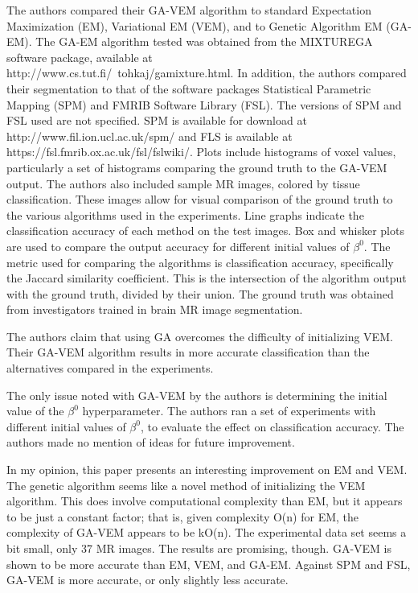 \documentclass[11pt]{article}
\begin{document}
The authors compared their GA-VEM algorithm to standard Expectation Maximization
(EM), Variational EM (VEM), and to Genetic Algorithm EM (GA-EM). The GA-EM
algorithm tested was obtained from the MIXTUREGA software package, available at
\\ http://www.cs.tut.fi/~tohkaj/gamixture.html. In addition, the authors
compared their segmentation to that of the software packages Statistical
Parametric Mapping (SPM) and FMRIB Software Library (FSL). The versions of SPM
and FSL used are not specified. SPM is available for download at
http://www.fil.ion.ucl.ac.uk/spm/ and FLS is available at
https://fsl.fmrib.ox.ac.uk/fsl/fslwiki/. Plots include histograms of voxel
values, particularly a set of histograms comparing the ground truth to the
GA-VEM output. The authors also included sample MR images, colored by tissue
classification. These images allow for visual comparison of the ground truth to
the various algorithms used in the experiments. Line graphs indicate the
classification accuracy of each method on the test images. Box and whisker plots
are used to compare the output accuracy for different initial values of
\(\beta^0\). The metric used for comparing the algorithms is classification
accuracy, specifically the Jaccard similarity coefficient. This is the
intersection of the algorithm output with the ground truth, divided by their
union. The ground truth was obtained from investigators trained in brain MR
image segmentation.

The authors claim that using GA overcomes the difficulty of initializing VEM.
Their GA-VEM algorithm results in more accurate classification than the
alternatives compared in the experiments.

The only issue noted with GA-VEM by the authors is determining the initial value
of the \(\beta^0\) hyperparameter. The authors ran a set of experiments with
different initial values of \(\beta^0\), to evaluate the effect on
classification accuracy. The authors made no mention of ideas for future
improvement.

In my opinion, this paper presents an interesting improvement on EM and VEM. The
genetic algorithm seems like a novel method of initializing the VEM algorithm.
This does involve computational complexity than EM, but it appears to be just a
constant factor; that is, given complexity O(n) for EM, the complexity of GA-VEM
appears to be kO(n). The experimental data set seems a bit small, only 37 MR
images. The results are promising, though. GA-VEM is shown to be more accurate
than EM, VEM, and GA-EM. Against SPM and FSL, GA-VEM is more accurate, or only
slightly less accurate.
\end{document}
